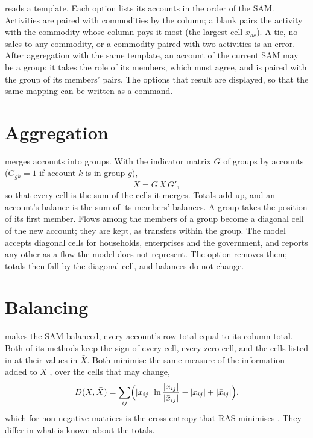  reads a template. Each option lists its accounts in the
order of the SAM. Activities are paired with commodities by the 
column; a blank  pairs the activity with the commodity whose column
pays it most (the largest cell $x_{ac}$). A tie, no sales to any commodity, or a
commodity paired with two activities is an error. After aggregation with the
same template, an account of the current SAM may be a group: it takes the role
of its members, which must agree, and is paired with the group of its members'
pairs. The options that result are displayed, so that the same mapping can be
written as a command.

\section{Aggregation}\label{sec:aggregation}

 merges accounts into groups. With the indicator matrix
$G$ of groups by accounts ($G_{gk} = 1$ if account $k$ is in group $g$),
\begin{equation*}
X = G\,\bar X\,G',
\end{equation*}
so that every cell is the sum of the cells it merges. Totals add up, and an
account's balance is the sum of its members' balances. A group takes the
position of its first member. Flows among the members of a group become a
diagonal cell of the new account; they are kept, as transfers within the
group. The model accepts diagonal cells for households, enterprises and the
government, and  reports any other as a flow the model does not
represent. The option  removes them; totals then fall by the
diagonal cell, and balances do not change.

\section{Balancing}\label{sec:balancing}

 makes the SAM balanced, every account's row total equal to
its column total. Both of its methods keep the sign of every cell, every zero
cell, and the cells listed in  at their values in $\bar X$. Both
minimise the same measure of the information added to $\bar X$
\citep{junius2003,lenzen2007}, over the cells that may change,
\begin{equation*}
D(X, \bar X) = \sum_{ij} \Bigl(|x_{ij}|\,\ln\frac{|x_{ij}|}{|\bar x_{ij}|} - |x_{ij}| + |\bar x_{ij}|\Bigr),
\end{equation*}
which for non-negative matrices is the cross entropy that RAS minimises
\citep{mcdougall1999}. They differ in what is known about the totals.

